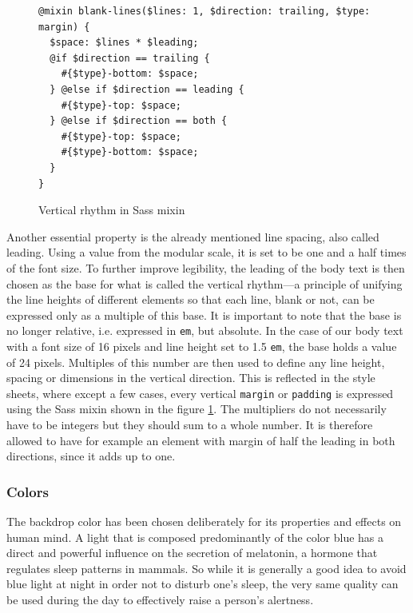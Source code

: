 \documentclass[thesis=M,english,hidelinks]{FITthesis}[2012/10/20]
\newcommand{\code}{\texttt}
\begin{document}
\begin{figure}[h]
  \begin{lstlisting}
@mixin blank-lines($lines: 1, $direction: trailing, $type: margin) {
  $space: $lines * $leading;
  @if $direction == trailing {
    #{$type}-bottom: $space;
  } @else if $direction == leading {
    #{$type}-top: $space;
  } @else if $direction == both {
    #{$type}-top: $space;
    #{$type}-bottom: $space;
  }
}
  \end{lstlisting}
  \caption{Vertical rhythm in Sass mixin}
  \label{fig:vertical_rhythm_mixin}
\end{figure}

Another essential property is the already mentioned line spacing, also called leading. Using a value from the modular scale, it is set to be one and a half times of the font size. To further improve legibility, the leading of the body text is then chosen as the base for what is called the vertical rhythm---a principle of unifying the line heights of different elements so that each line, blank or not, can be expressed only as a multiple of this base. It is important to note that the base is no longer relative, i.e. expressed in \code{em}, but absolute. In the case of our body text with a font size of 16 pixels and line height set to 1.5 \code{em}, the base holds a value of 24 pixels. Multiples of this number are then used to define any line height, spacing or dimensions in the vertical direction. This is reflected in the style sheets, where except a few cases, every vertical \code{margin} or \code{padding} is expressed using the Sass mixin shown in the figure \ref{fig:vertical_rhythm_mixin}. The multipliers do not necessarily have to be integers but they should sum to a whole number. It is therefore allowed to have for example an element with margin of half the leading in both directions, since it adds up to one.

    \subsubsection{Colors}

The backdrop color has been chosen deliberately for its properties and effects on human mind. A light that is composed predominantly of the color blue has a direct and powerful influence on the secretion of melatonin, a hormone that regulates sleep patterns in mammals. So while it is generally a good idea to avoid blue light at night in order not to disturb one's sleep, the very same quality can be used during the day to effectively raise a person's alertness.
\end{document}
